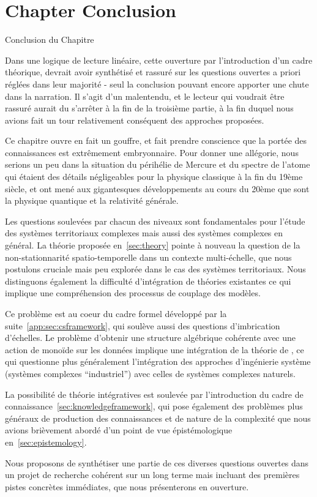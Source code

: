 



\newpage


\section*{Chapter Conclusion}{Conclusion du Chapitre}


Dans une logique de lecture linéaire, cette ouverture par l'introduction d'un cadre théorique, devrait avoir synthétisé et rassuré sur les questions ouvertes a priori réglées dans leur majorité - seul la conclusion pouvant encore apporter une chute dans la narration. Il s'agit d'un malentendu, et le lecteur qui voudrait être rassuré aurait du s'arrêter à la fin de la troisième partie, à la fin duquel nous avions fait un tour relativement conséquent des approches proposées.


Ce chapitre ouvre en fait un gouffre, et fait prendre conscience que la portée des connaissances est extrêmement embryonnaire. Pour donner une allégorie, nous serions un peu dans la situation du périhélie de Mercure et du spectre de l'atome qui étaient des détails négligeables pour la physique classique à la fin du 19ème siècle, et ont mené aux gigantesques développements au cours du 20ème que sont la physique quantique et la relativité générale.

Les questions soulevées par chacun des niveaux sont fondamentales pour l'étude des systèmes territoriaux complexes mais aussi des systèmes complexes en général. La théorie proposée en~\ref{sec:theory} pointe à nouveau la question de la non-stationnarité spatio-temporelle dans un contexte multi-échelle, que nous postulons cruciale mais peu explorée dans le cas des systèmes territoriaux. Nous distinguons également la difficulté d'intégration de théories existantes ce qui implique une compréhension des processus de couplage des modèles.

Ce problème est au coeur du cadre formel développé par la suite~\ref{app:sec:csframework}, qui soulève aussi des questions d'imbrication d'échelles. Le problème d'obtenir une structure algébrique cohérente avec une action de monoïde sur les données implique une intégration de la théorie de , ce qui questionne plus généralement l'intégration des approches d'ingénierie système (systèmes complexes ``industriel'') avec celles de systèmes complexes naturels.

La possibilité de théorie intégratives est soulevée par l'introduction du cadre de connaissance~\ref{sec:knowledgeframework}, qui pose également des problèmes plus généraux de production des connaissances et de nature de la complexité que nous avions brièvement abordé d'un point de vue épistémologique en~\ref{sec:epistemology}.


Nous proposons de synthétiser une partie de ces diverses questions ouvertes dans un projet de recherche cohérent sur un long terme mais incluant des premières pistes concrètes immédiates, que nous présenterons en ouverture.




\stars
